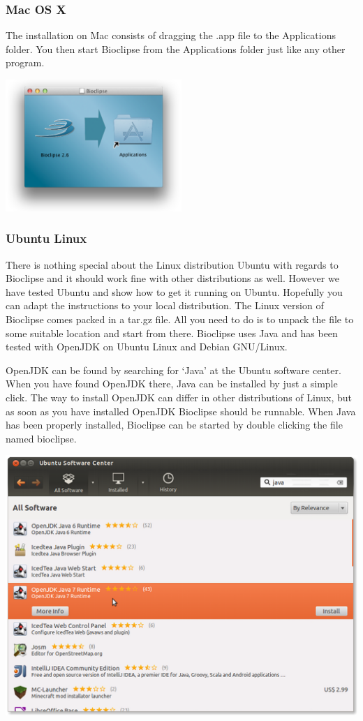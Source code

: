 \documentclass[a5paper, 10pt]{memoir}
\begin{document}
\begin{refsection}
\subsubsection{Mac OS X}
The installation on Mac consists of dragging the .app file to the Applications
folder. You then start Bioclipse from the Applications folder just like any
other program. 
\begin{center}
\includegraphics[width=0.5\textwidth]{images/MacInstaller.png}
\end{center}
\subsubsection{Ubuntu Linux}
There is nothing special about the Linux distribution Ubuntu with regards to
Bioclipse and it should work fine with other distributions as well. However we
have tested Ubuntu and show how to get it running on Ubuntu. Hopefully you can
adapt the instructions to your local distribution.
The Linux version of Bioclipse comes packed in a tar.gz file. All you need to
do is to unpack the file to some suitable location and start from there.
Bioclipse uses Java and has been tested with OpenJDK on Ubuntu Linux and Debian
GNU/Linux. 

OpenJDK can be found by searching for `Java' at the Ubuntu software center.
When you have found OpenJDK there, Java can be installed by just a simple
click. The way to install OpenJDK can differ in other distributions of Linux,
but as soon as you have installed OpenJDK Bioclipse should be runnable. When
Java has been properly installed, Bioclipse can be started by double clicking
the file named bioclipse.
\begin{center}
\includegraphics[width=1\textwidth]{images/Java7onUbuntu.png}
\end{center}


\end{refsection}
\end{document}
